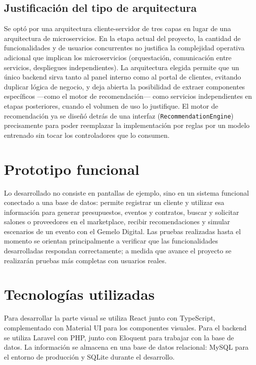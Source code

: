 \subsection{Justificación del tipo de arquitectura}

Se optó por una arquitectura cliente-servidor de tres capas en lugar de
una arquitectura de microservicios. En la etapa actual del proyecto, la
cantidad de funcionalidades y de usuarios concurrentes no justifica la
complejidad operativa adicional que implican los microservicios
(orquestación, comunicación entre servicios, despliegues independientes).
La arquitectura elegida permite que un único backend sirva tanto al panel
interno como al portal de clientes, evitando duplicar lógica de negocio,
y deja abierta la posibilidad de extraer componentes específicos ---como
el motor de recomendación--- como servicios independientes en etapas
posteriores, cuando el volumen de uso lo justifique. El motor de
recomendación ya se diseñó detrás de una interfaz
(\texttt{RecommendationEngine}) precisamente para poder reemplazar la
implementación por reglas por un modelo entrenado sin tocar los
controladores que lo consumen.

\section{Prototipo funcional}

Lo desarrollado no consiste en pantallas de ejemplo, sino en un sistema
funcional conectado a una base de datos: permite registrar un cliente y
utilizar esa información para generar presupuestos, eventos y contratos,
buscar y solicitar salones o proveedores en el marketplace, recibir
recomendaciones y simular escenarios de un evento con el Gemelo Digital.
Las pruebas realizadas hasta el momento se orientan principalmente a
verificar que las funcionalidades desarrolladas respondan correctamente;
a medida que avance el proyecto se realizarán pruebas más completas con
usuarios reales.

\section{Tecnologías utilizadas}

Para desarrollar la parte visual se utiliza React junto con TypeScript,
complementado con Material UI para los componentes visuales. Para el
backend se utiliza Laravel con PHP, junto con Eloquent para trabajar con
la base de datos. La información se almacena en una base de datos
relacional: MySQL para el entorno de producción y SQLite durante el
desarrollo.

